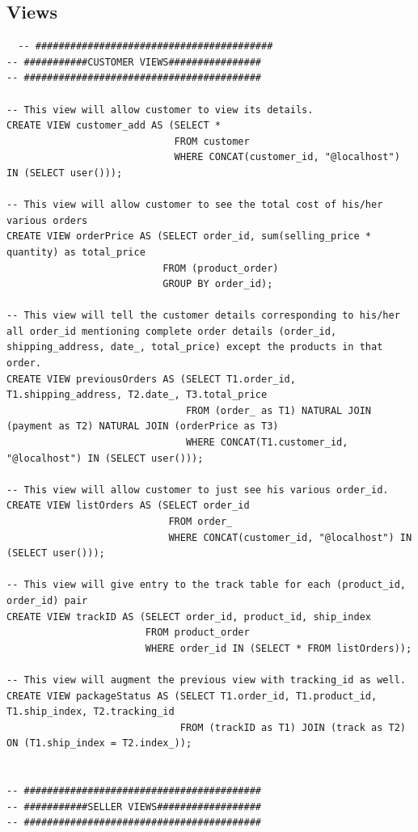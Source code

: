 \documentclass[a4paper,12pt]{article}
\begin{document}
\subsection{Views}
\begin{verbatim}
  -- #########################################
-- ###########CUSTOMER VIEWS################
-- #########################################

-- This view will allow customer to view its details.
CREATE VIEW customer_add AS (SELECT * 
                             FROM customer 
                             WHERE CONCAT(customer_id, "@localhost") IN (SELECT user()));

-- This view will allow customer to see the total cost of his/her various orders
CREATE VIEW orderPrice AS (SELECT order_id, sum(selling_price * quantity) as total_price
                           FROM (product_order)
                           GROUP BY order_id); 

-- This view will tell the customer details corresponding to his/her all order_id mentioning complete order details (order_id, shipping_address, date_, total_price) except the products in that order. 
CREATE VIEW previousOrders AS (SELECT T1.order_id, T1.shipping_address, T2.date_, T3.total_price
                               FROM (order_ as T1) NATURAL JOIN (payment as T2) NATURAL JOIN (orderPrice as T3)
                               WHERE CONCAT(T1.customer_id, "@localhost") IN (SELECT user()));

-- This view will allow customer to just see his various order_id. 
CREATE VIEW listOrders AS (SELECT order_id
                            FROM order_ 
                            WHERE CONCAT(customer_id, "@localhost") IN (SELECT user()));

-- This view will give entry to the track table for each (product_id, order_id) pair
CREATE VIEW trackID AS (SELECT order_id, product_id, ship_index
                        FROM product_order
                        WHERE order_id IN (SELECT * FROM listOrders));

-- This view will augment the previous view with tracking_id as well.
CREATE VIEW packageStatus AS (SELECT T1.order_id, T1.product_id, T1.ship_index, T2.tracking_id
                              FROM (trackID as T1) JOIN (track as T2) ON (T1.ship_index = T2.index_));


-- #########################################
-- ###########SELLER VIEWS##################
-- #########################################


\end{verbatim}
\end{document}
